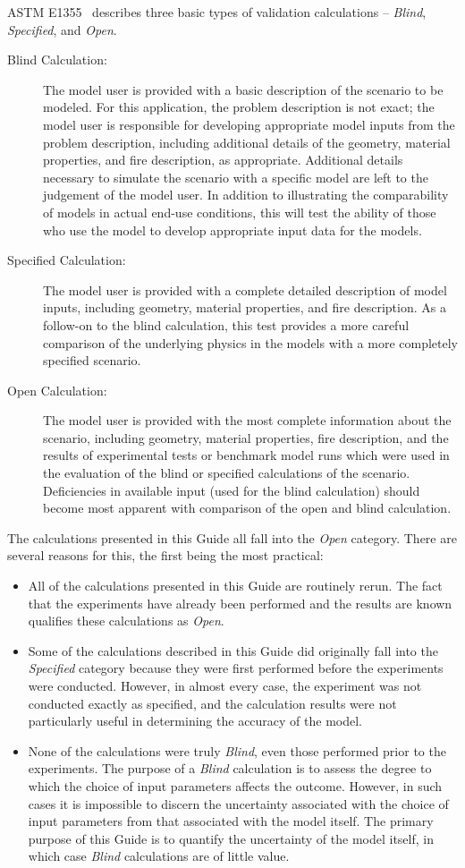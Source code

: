 ASTM E1355~\cite{CFAST:ASTM:E1355} describes three basic types of validation calculations -- {\em Blind}, {\em Specified}, and
{\em Open}.
\begin{description}
\item [Blind Calculation:] The model user is provided with a basic description of the scenario to be modeled. For this application, the problem description is not exact; the model user is responsible for developing appropriate model inputs from the problem description, including additional details of the geometry, material properties, and fire description, as appropriate. Additional details necessary to simulate the scenario with a specific model are left to the judgement of the model user. In addition to illustrating the comparability of models in actual end-use conditions, this will test the ability of those who use the model to develop appropriate input data for the models.
\item [Specified Calculation:] The model user is provided with a complete detailed description of model inputs, including geometry, material properties, and fire description. As a follow-on to the blind calculation, this test provides a more careful comparison of the underlying physics in the models with a more completely specified scenario.
\item [Open Calculation:] The model user is provided with the most complete information about the scenario, including geometry, material properties, fire description, and the results of experimental tests or benchmark model runs which were used in the evaluation of the blind or specified calculations of the scenario. Deficiencies in available input (used for the blind calculation) should become most apparent with comparison of the open and blind calculation.
\end{description}
The calculations presented in this Guide all fall into the {\em Open} category. There are several reasons for this, the first being the most practical:
\begin{itemize}
\item All of the calculations presented in this Guide are routinely rerun. The fact that the experiments have already been performed and the results are known qualifies these calculations as {\em Open}.
\item Some of the calculations described in this Guide did originally fall into the {\em Specified} category because they were first performed before the experiments were conducted. However, in almost every case, the experiment was not conducted exactly as specified, and the calculation results were not particularly useful in determining the accuracy of the model. \item None of the calculations were truly {\em Blind}, even those performed prior to the experiments. The purpose of a {\em Blind} calculation is to assess the degree to which the choice of input parameters affects the outcome. However, in such cases it is impossible to discern the uncertainty associated with the choice of input parameters from that associated with the model itself. The primary purpose of this Guide is to quantify the uncertainty of the model itself, in which case {\em Blind} calculations are of little value.
\end{itemize}


